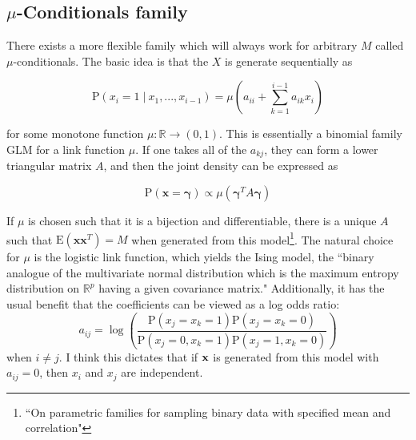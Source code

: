 \documentclass[11pt]{article}
\newcommand{\R}{\mathbb{R}}
\newcommand{\p}{\mathrm{P}}
\newcommand{\E}{\mathrm{E}}
\newcommand{\st}{ \; \big | \:}
\theoremstyle{definition}
\begin{document}
\subsection{$\mu$-Conditionals family}
    There exists a more flexible family which will always work for arbitrary $M$ called $\mu$-conditionals. The basic idea is that the $X$ is generate sequentially as 

    \[ \p(x_{i}=1\st x_{1},...,x_{i-1}) = \mu\left(a_{ii}+\sum_{k=1}^{i-1}a_{ik}x_i\right) \]

    for some monotone function $\mu:\R\to(0,1)$. This is essentially a binomial family GLM for a link function $\mu$. If one takes all of the $a_{kj}$, they can form a lower triangular matrix $A$, and then the joint density can be expressed as 

    \[ \p(\mathbf x=\mathbf \gamma) \propto \mu(\mathbf{\gamma}^T A\mathbf \gamma)\]

    If $\mu$ is chosen such that it is a bijection and differentiable, there is a unique $A$ such that $\E(\mathbf x \mathbf x^T)=M$ when generated from this model\footnote{``On parametric families for sampling binary data with specified mean and correlation"}. The natural choice for $\mu$ is the logistic link function, which yields the Ising model, the ``binary analogue of the multivariate normal distribution which is the maximum entropy distribution on $\R^p$ having a given covariance matrix." Additionally, it has the usual benefit that the coefficients can be viewed as a log odds ratio:
    \[a_{ij} = \log\left(\frac{\p(x_j=x_k=1)\p(x_j=x_k=0)}{\p(x_j=0,x_k=1)\p(x_j=1,x_k=0)}\right) \]
    when $i\neq j$. I think this dictates that if $\bf x$ is generated from this model with $a_{ij}=0$, then $x_i$ and $x_j$ are independent.  \par
\end{document}

